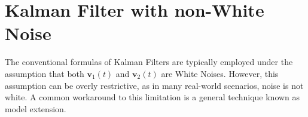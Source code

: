 \section{Kalman Filter with non-White Noise}

The conventional formulas of Kalman Filters are typically employed under the assumption that both $\mathbf{v}_1(t)$ and $\mathbf{v}_2(t)$ are White Noises. 
However, this assumption can be overly restrictive, as in many real-world scenarios, noise is not white.
A common workaround to this limitation is a general technique known as model extension.